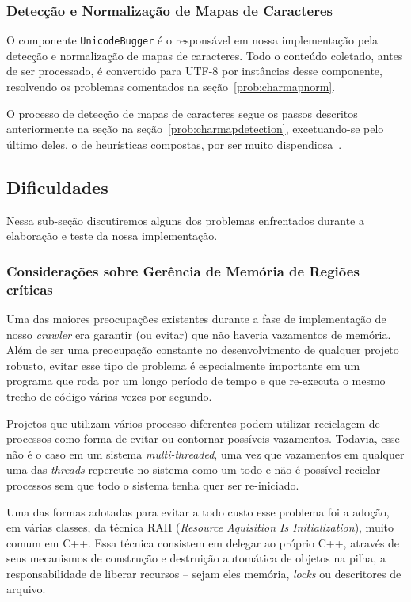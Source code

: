 \documentclass[10pt,twocolumn]{article}
\begin{document}
\subsubsection{Detecção e Normalização de Mapas de Caracteres}

O componente \texttt{UnicodeBugger} é o responsável em nossa
implementação pela detecção e normalização de mapas de caracteres.  Todo
o conteúdo coletado, antes de ser processado, é convertido para UTF-8
por instâncias desse componente, resolvendo os problemas comentados na
seção~\ref{prob:charmapnorm}.

O processo de detecção de mapas de caracteres segue os passos descritos
anteriormente na seção na seção~\ref{prob:charmapdetection},
excetuando-se pelo último deles, o de heurísticas compostas, por ser
muito dispendiosa~\cite{mozillaiuc}.

\subsection{Dificuldades}

Nessa sub-seção discutiremos alguns dos problemas enfrentados durante a
elaboração e teste da nossa implementação.

\subsubsection{Considerações sobre Gerência de Memória de Regiões críticas}

Uma das maiores preocupações existentes durante a fase de implementação
de nosso \emph{crawler} era garantir (ou evitar) que não haveria
vazamentos de memória. Além de ser uma preocupação constante no
desenvolvimento de qualquer projeto robusto, evitar esse tipo de
problema é especialmente importante em um programa que roda por um longo
período de tempo e que re-executa o mesmo trecho de código várias vezes
por segundo.

Projetos que utilizam vários processo diferentes podem
utilizar reciclagem de processos como forma de evitar ou contornar
possíveis vazamentos. Todavia, esse não é o caso em  um sistema
\emph{multi-threaded}, uma vez que vazamentos em qualquer uma das
\emph{threads} repercute no sistema como um todo e não é possível
reciclar processos sem que todo o sistema tenha quer ser re-iniciado.

Uma das formas adotadas para evitar a todo custo esse problema foi a
adoção, em várias classes, da técnica RAII (\emph{Resource Aquisition
Is Initialization}), muito comum em C++. Essa técnica consistem em
delegar ao próprio C++, através de seus mecanismos de construção e
destruição automática de objetos na pilha, a responsabilidade de liberar
recursos -- sejam eles memória, \emph{locks} ou descritores de arquivo.
\end{document}
